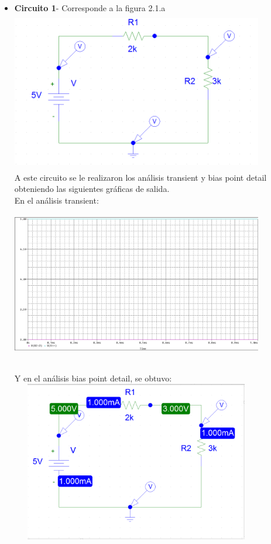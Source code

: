 \documentclass[12pt]{article}
\begin{document}
	\begin{itemize}
		\item \textbf{Circuito 1}- Corresponde a la figura 2.1.a\\ 
		
		\includegraphics[width=11cm,height=7cm]{Img/dc_dos_resis.png}\\
		
		\noindent A este circuito se le realizaron los análisis transient y bias point detail obteniendo las siguientes gráficas de salida.\\
		
		\noindent En el análisis transient:\\
		
		\includegraphics[width=11cm,height=7cm]{Img/Fuente_DC_y_dos_resistencias.png}
		
		\newpage
		 
		\noindent Y en el análisis bias point detail, se obtuvo:\\
		
		\includegraphics[width=11cm,height=7cm]{Img/Fuente_DC_y_dos_resistencias_Bias_analisis.png}\\
		

\end{itemize}
\end{document}
